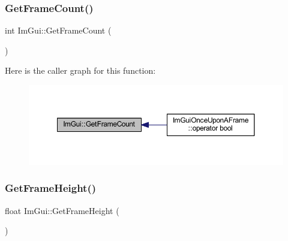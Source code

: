 \mbox{\label{namespace_im_gui_a0180211f23fc10807dfc3d2f6e8681f9}} 
\subsubsection{\texorpdfstring{Get\+Frame\+Count()}{GetFrameCount()}}
{\footnotesize\ttfamily int Im\+Gui\+::\+Get\+Frame\+Count (\begin{DoxyParamCaption}{ }\end{DoxyParamCaption})}

Here is the caller graph for this function\+:
\nopagebreak
\begin{figure}[H]
\begin{center}
\leavevmode
\includegraphics[width=350pt]{namespace_im_gui_a0180211f23fc10807dfc3d2f6e8681f9_icgraph}
\end{center}
\end{figure}
\mbox{\label{namespace_im_gui_ae560f17cf3262017cee888d1eb77f294}} 
\subsubsection{\texorpdfstring{Get\+Frame\+Height()}{GetFrameHeight()}}
{\footnotesize\ttfamily float Im\+Gui\+::\+Get\+Frame\+Height (\begin{DoxyParamCaption}{ }\end{DoxyParamCaption})}

